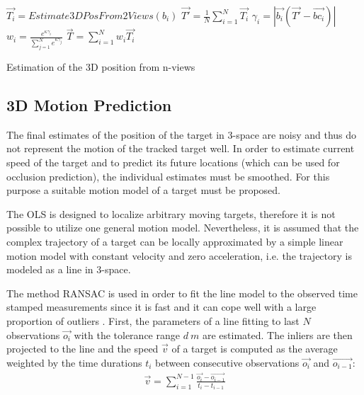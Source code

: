 \begin{algorithm}
	\SetAlgoNoLine	
	\DontPrintSemicolon
	\BlankLine
	
	{
		$\vec{T_{i}} = Estimate3DPosFrom2Views(b_{i})$\;
	}
	$\vec{T'} = \frac{1}{N}\sum_{i=1}^{N}\vec{T_{i}}$\;	
	{
		$\gamma_{i} = |\vec{b_{i}}(\vec{T'} - \vec{bc_{i}})|$\;
		$w_{i} = \frac{e^{\kappa\gamma_{i}}}{\sum_{j=1}^{N}e^{\kappa\gamma_{j}}}$\;
	}
	$\vec{T} = \sum_{i=1}^{N}w_{i}\vec{T_{i}}$	
	\caption{Estimation of the 3D position from n-views}
	\label{alg:3dPosEstimation}
\end{algorithm}


\subsection{3D Motion Prediction} \label{txt:3d_motion_predicition}

The final estimates of the position of the target in 3-space are noisy and thus do not represent the motion of the tracked target well. In order to estimate current speed of the target and to predict its future locations (which can be used for occlusion prediction), the individual estimates must be smoothed. For this purpose a suitable motion model of a target must be proposed.

The OLS is designed to localize arbitrary moving targets, therefore it is not possible to utilize one general motion model. Nevertheless, it is assumed that the complex trajectory of a target can be locally approximated by a simple linear motion model with constant velocity and zero acceleration, i.e. the trajectory is modeled as a line in 3-space.

The method RANSAC is used in order to fit the line model to the observed time stamped measurements since it is fast and it can cope well with a large proportion of outliers \cite{Hartley:2003:MVG:861369}. First, the parameters of a line fitting to last $N$ observations $\vec{o_{i}}$ with the tolerance range $d~m$ are estimated. The inliers are then projected to the line and the speed $\vec{v}$ of a target is computed as the average weighted by the time durations $t_{i}$ between consecutive observations $\vec{o_{i}}$ and $\vec{o_{i-1}}$:
\begin{align}
	\vec{v} = \sum_{i=1}^{N-1}{\frac{\vec{o_{i}} - \vec{o_{i-1}}}{t_{i} - t_{i-1}}}
\end{align}

